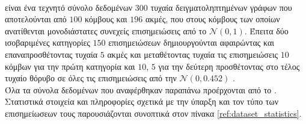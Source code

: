 \paragraph*{} είναι ένα τεχνητό σύνολο δεδομένων $300$ τυχαία δειγματοληπτημένων γράφων που αποτελούνται από $100$ κόμβους και $196$ ακμές, που στους κόμβους των οποίων ανατίθενται μονοδιάστατες συνεχείς επισημειώσεις από το $\mathcal{N}(0, 1)$.
Έπειτα δύο ισοβαριμένες κατηγορίες $150$ επισημειώσεων δημιουργούνται αφαιρώντας και επαναπροσθέτοντας τυχαία $5$ ακμές και μεταθέτοντας τυχαία τις επισημειώσεις $10$ κόμβων για την πρώτη κατηγορία και $10$, $5$ για την δεύτερη προσθέτοντας στο τέλος τυχαίο θόρυβο σε όλες τις επισημειώσεις από την $\mathcal{N}(0, 0.452)$ \cite{Feragen13}.
\newline \\
Όλα τα σύνολα δεδομένων που αναφέρθηκαν παραπάνω προέρχονται από το \cite{KKMMN2016}. Στατιστικά στοιχεία και πληροφορίες σχετικά με την ύπαρξη και τον τύπο των επισημείωσεων τους παρουσιάζονται συνοπτικά στον πίνακα \ref{ref:dataset_statistics}.

